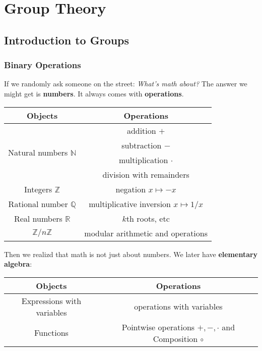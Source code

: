 \newpage
\pagestyle{headings}

\ifbook
\mainmatter
\fi 

\part{Group Theory}

\chapter{Introduction to Groups}
\section{Binary Operations}

If we randomly ask someone on the street: \textit{What's math about?} The answer we might get is \textbf{numbers}. It always comes with \textbf{operations}.

\begin{center}
	\begin{tabular}{c | c}
		Objects & Operations\\\hline\hline 
		\multirow{4}{*}{Natural numbers $\mathbb N$} & addition $+$
		\\ & subtraction $-$\\ & multiplication $\cdot$ \\ & division with remainders\\\hline 
		Integers $\mathbb Z$ & negation $x\mapsto -x$ \\\hline
		Rational number $\mathbb{Q}$ & multiplicative inversion $x\mapsto 1/x$\\\hline 
		Real numbers $\mathbb R$ & $k$th roots, etc\\\hline
		$\mathbb Z/n\mathbb Z$ & modular arithmetic and operations 
	\end{tabular}
\end{center}

Then we realizd that math is not just about numbers. We later have \textbf{elementary algebra}:

\begin{center}
\begin{tabular}{c | c}
Objects & Operations \\\hline\hline 
Expressions with variables & operations with variables \\\hline 
Functions & Pointwise operations $+,-,\cdot$ and Composition $\circ$
\end{tabular}
\end{center}

